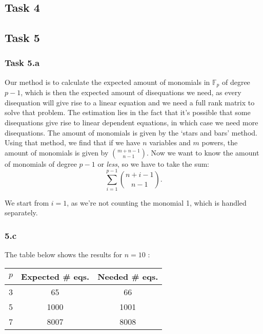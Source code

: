 \documentclass{article}
\begin{document}
\subsection*{Task 4}

\subsection*{Task 5}

\subsubsection*{Task 5.a}
Our method is to calculate the expected amount of monomials in $\mathbb{F}_p$ of
degree $p - 1$, which is then the expected amount of disequations we need, as
every disequation will give rise to a linear equation and we need a full rank
matrix to solve that problem. The estimation lies in the fact that it's possible
that some disequations give rise to linear dependent equations, in which case we
need more disequations. The amount of monomials is given by the `stars and bars'
method. Using that method, we find that if we have $n$ variables and $m$ powers,
the amount of monomials is given by ${m + n - 1}\choose{n - 1}$. Now we want to know
the amount of monomials of degree $p-1$ or \textit{less}, so we have to take the
sum:
\begin{equation}
  \sum_{i = 1}^{p-1}  {{n + i - 1}\choose{n - 1}}.
\end{equation} 

We start from $i = 1$, as we're not counting the monomial 1, which is handled
separately.


\subsubsection*{5.c}

The table below shows the results for $n = 10$ :

 \begin{table}[htpb]
  \centering
  \label{tab:label}
  \begin{tabular}{ccc}
    \toprule
    $p$ & Expected \# eqs. & Needed \# eqs. \\
    \midrule
    3 & 65 & 66 \\
    \midrule
    5 &1000&  1001 \\
    \midrule
    7 &8007& 8008\\
    \bottomrule
  \end{tabular}
\end{table}
\end{document}
